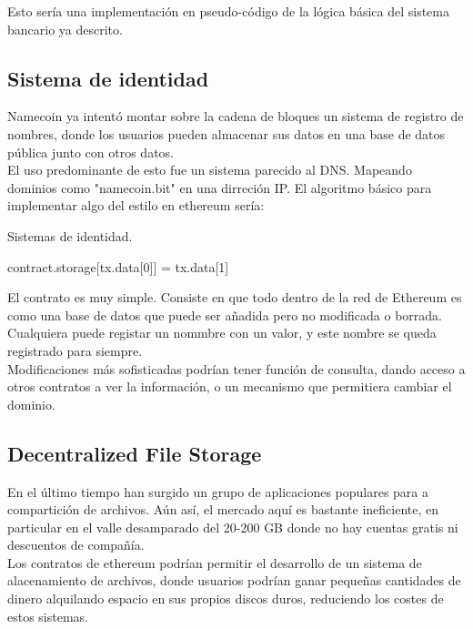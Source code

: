 \documentclass[11pt,a4paper]{article}
\begin{document}
Esto sería una implementación en pseudo-código de la lógica básica del sistema bancario ya descrito.


\subsection{Sistema de identidad}
Namecoin ya intentó montar sobre la cadena de bloques un sistema de registro de nombres, donde los usuarios pueden almacenar sus datos en una base de datos pública junto con otros datos.\\

El uso predominante de esto fue un sistema parecido al DNS. Mapeando dominios como "namecoin.bit" en una dirreción IP. El algoritmo básico para implementar algo del estilo en ethereum sería:

\begin{algorithm}
  \caption{Sistemas de identidad.}\label{token}
  \begin{algorithmic}[1]
    			
    
    \State contract.storage[tx.data[0]] = tx.data[1]
   
    \EndIf
    \EndProcedure
  \end{algorithmic}
\end{algorithm}


El contrato es muy simple. Consiste en que todo dentro de la red de Ethereum es como una base de datos que puede ser añadida pero no modificada o borrada. Cualquiera puede registar un nommbre con un valor, y este nombre se queda registrado para siempre.\\

Modificaciones más sofisticadas podrían tener función de consulta, dando acceso a otros contratos a ver la información, o un mecanismo que permitiera cambiar el dominio.
\subsection{Decentralized File Storage}

En el último tiempo han surgido un grupo de aplicaciones populares para a compartición de archivos. Aún así,  el mercado aquí es bastante ineficiente, en particular en el valle desamparado del 20-200 GB donde no hay cuentas gratis ni descuentos de compañía. \\

Los contratos de ethereum podrían permitir  el desarrollo de un sistema de alacenamiento de archivos, donde usuarios podrían ganar pequeñas cantidades de dinero alquilando espacio en sus propios discos duros, reduciendo los costes de estos sistemas.\\
\end{document}
